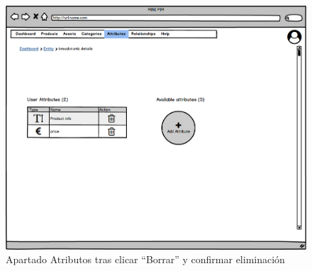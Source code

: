 \begin{figure}[H]
    \includegraphics[width=1\linewidth]{mockups/RF6.4BorrarAtributoDespuesDeBorrar.png}
    \caption{Apartado Atributos tras clicar \enquote{Borrar} y confirmar eliminación}
   \end{figure}
\vspace{1.0cm}




\newpage %